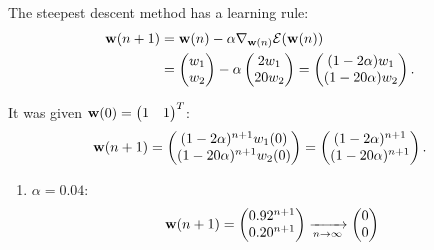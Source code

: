 \begin{enumerate}
\begin{solution}
    The steepest descent method has a learning rule:
    \begin{equation*}
      \begin{split}
        {\bf{w}}(n+1) & = {\bf{w}}(n)- \alpha \nabla_{{\bf{w}}(n)} {\cal E} ({\bf{w}}(n)) \\
        & = \begin{pmatrix} w_1 \\  w_2 \end{pmatrix} - \alpha
        \begin{pmatrix} 2 w_1 \\  20 w_2 \end{pmatrix} = \begin{pmatrix}
          (1 - 2 \alpha) w_1 \\  (1 - 20 \alpha) w_2 \end{pmatrix} .
      \end{split}
    \end{equation*}

    It was given ${\bf{w}}(0) = \begin{pmatrix} 1 & 1 \end{pmatrix}^T$:
    \begin{equation*}
      {\bf{w}}(n+1) = \begin{pmatrix} (1 - 2 \alpha)^{n+1} w_1(0) \\  (1 - 20
        \alpha)^{n+1} w_2(0) \end{pmatrix} = \begin{pmatrix} (1 - 2
        \alpha)^{n+1} \\  (1 - 20 \alpha)^{n+1} \end{pmatrix}. 
    \end{equation*}

    \begin{enumerate}
    \item $\alpha = 0.04$: 
      \begin{equation*}
        {\bf{w}}(n+1) = \begin{pmatrix} 0.92^{n+1} \\
          0.20^{n+1} \end{pmatrix} \xrightarrow[n\rightarrow\infty]{}\begin{pmatrix}0\\0\end{pmatrix}
      \end{equation*}


\end{enumerate}
\end{solution}
\end{enumerate}
